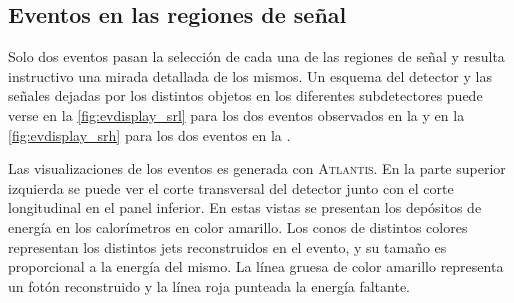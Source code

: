\subsection{Eventos en las regiones de señal}

Solo dos eventos pasan la selección de cada una de las regiones de señal y resulta
instructivo una mirada detallada de los mismos. Un
esquema del detector y las se\~nales dejadas por los distintos objetos en los diferentes
subdetectores puede verse en la \cref{fig:evdisplay_srl} para los dos eventos
observados en la {\SRL} y en la \cref{fig:evdisplay_srh} para los dos eventos
en la {\SRH}.

Las visualizaciones de los eventos es generada con
\textsc{Atlantis}\cite{atlantis}. En la parte superior izquierda se puede ver el
corte transversal del detector junto con el corte longitudinal en el panel
inferior. En estas vistas se presentan los depósitos de energía en los
calorímetros en color amarillo. Los conos de distintos colores representan los
distintos jets reconstruidos en el evento, y su tama\~no es proporcional a la
energía del mismo. La línea gruesa de color amarillo representa un fotón
reconstruido y la línea roja punteada la energía faltante.













